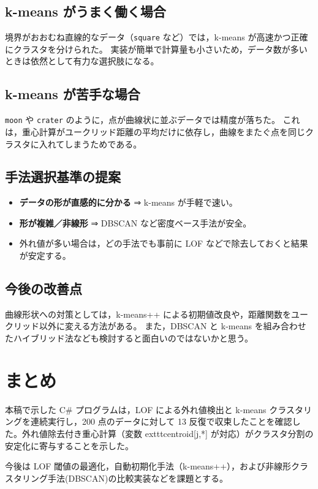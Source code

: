 \documentclass[a4j,dvipdfmx]{jsarticle}
\begin{document}
\subsection*{k-means がうまく働く場合}
境界がおおむね直線的なデータ（\texttt{square} など）では，k-means が高速かつ正確にクラスタを分けられた。  
実装が簡単で計算量も小さいため，データ数が多いときは依然として有力な選択肢になる。

\subsection*{k-means が苦手な場合}
\texttt{moon} や \texttt{crater} のように，点が曲線状に並ぶデータでは精度が落ちた。  
これは，重心計算がユークリッド距離の平均だけに依存し，曲線をまたぐ点を同じクラスタに入れてしまうためである。

\subsection*{手法選択基準の提案}
\begin{itemize}
  \item \textbf{データの形が直感的に分かる} ⇒ k-means が手軽で速い。  
  \item \textbf{形が複雑／非線形} ⇒ DBSCAN など密度ベース手法が安全。  
  \item 外れ値が多い場合は，どの手法でも事前に LOF などで除去しておくと結果が安定する。
\end{itemize}

\subsection*{今後の改善点}
曲線形状への対策としては，k-means++ による初期値改良や，距離関数をユークリッド以外に変える方法がある。  
また，DBSCAN と k-means を組み合わせたハイブリッド法なども検討すると面白いのではないかと思う。

\section{まとめ}
本稿で示した C\# プログラムは，LOF による外れ値検出と k-means クラスタリングを連続実行し，200 点のデータに対して 13 反復で収束したことを確認した。外れ値除去付き重心計算（変数 	exttt{centroid[j,*]} が対応）がクラスタ分割の安定化に寄与することを示した。

今後は LOF 閾値の最適化，自動初期化手法（k-means++），および非線形クラスタリング手法(DBSCAN)の比較実装などを課題とする。
\end{document}
